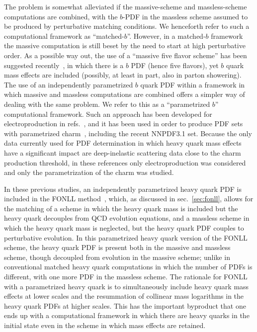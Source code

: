 The problem is somewhat
alleviated if the massive-scheme and massless-scheme
computations are combined, with the $b$-PDF in the massless scheme assumed to be
produced by perturbative matching conditions.  We  henceforth refer to
such a computational 
framework as ``matched-$b$''. However, in a matched-$b$ framework the
massive computation is still beset by the need to start at high
perturbative order.
As a possible way out, the use of a ``massive five flavor scheme'' has
been suggested recently~\cite{Krauss:2017wmx,Figueroa:2018chn}, in
which there is a $b$ PDF (hence five flavors), yet $b$ quark mass
effects are included (possibly, at least in part, also in parton showering).
The use of an independently parametrized $b$ quark PDF
within a framework in which massive and massless computations are
combined
offers a simpler way of dealing with the same
problem. We  refer to this as a ``parametrized $b$''
computational framework.
Such an approach has been developed for electroproduction in
refs.~\cite{Ball:2015tna,Ball:2015dpa}, and it has been used in order
to produce PDF sets with parametrized
charm~\cite{Ball:2016neh,Ball:2017nwa}, including the recent NNPDF3.1
set. Because the only data currently used for PDF determination in which 
heavy quark mass effects have  a significant impact are deep-inelastic
scattering data close  to the charm production threshold, in these
references only electroproduction was considered and only the
parametrization of the charm was studied.

In these previous studies, an independently parametrized heavy quark PDF is
included in the FONLL  method~\cite{Cacciari:1998it},
which, as discussed in sec.~\ref{sec:fonll}, allows for the
matching of a scheme in which the heavy quark mass is included but the
heavy quark decouples from QCD evolution equations, and a massless
scheme in which the heavy quark mass is neglected, but the heavy quark
PDF couples to perturbative evolution.
In this parametrized heavy quark version of the FONLL scheme, the heavy
quark PDF is present both in the massive and massless scheme, though
decoupled from evolution in the massive scheme; unlike in conventional
matched heavy quark computations
in which the number of PDFs is different, with one more
PDF in the massless scheme. The rationale for FONLL
with a parametrized heavy quark is to simultaneously include heavy quark
mass effects at lower scales and
the resummation of collinear mass logarithms in the heavy quark PDFs at
higher scales. This has the important byproduct that one
ends up with a computational framework in which there are heavy quarks in
the initial state even in the scheme in which mass effects are
retained.


